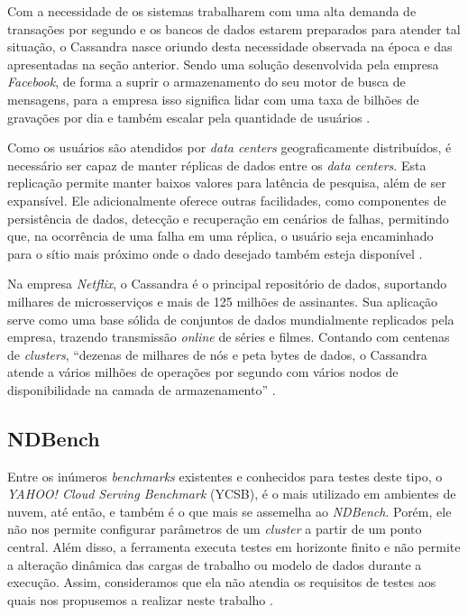 \documentclass[12pt,english,brazil]{article}
\begin{document}
Com a necessidade de os sistemas trabalharem com uma alta demanda de transações por segundo e os bancos de dados estarem preparados para atender tal situação, o Cassandra nasce oriundo desta necessidade observada na época e das apresentadas na seção anterior. Sendo uma solução desenvolvida pela empresa \textit{Facebook}, de forma a suprir o armazenamento do seu motor de busca de mensagens, para a empresa isso significa lidar com uma taxa de bilhões de gravações por dia e também escalar pela quantidade de usuários \cite{CASSANDRA}.

Como os usuários são atendidos por \textit{data centers} geograficamente distribuídos, é necessário ser capaz de manter réplicas de dados entre os \textit{data centers}. Esta replicação permite manter baixos valores para latência de pesquisa, além de ser expansível. Ele adicionalmente oferece outras facilidades, como componentes de persistência de dados, detecção e recuperação em cenários de falhas, permitindo que, na ocorrência de uma falha em uma réplica, o usuário seja encaminhado para o sítio mais próximo onde o dado desejado também esteja disponível \cite{overviewCassandra}.

Na empresa \textit{Netflix}, o Cassandra é o principal repositório de dados, suportando milhares de microsserviços e mais de 125 milhões de assinantes. Sua aplicação serve como uma base sólida de conjuntos de dados mundialmente replicados pela empresa, trazendo transmissão \textit{online} de séries e filmes. Contando com centenas de \textit{clusters}, ``dezenas de milhares de nós e peta bytes de dados, o Cassandra atende a vários milhões de operações por segundo com vários nodos de disponibilidade na camada de armazenamento'' \cite{NDBenchPAPER}.

\subsection{NDBench} \label{sec:NDBench}

Entre os inúmeros \textit{benchmarks} existentes e conhecidos para testes deste tipo, o \textit{YAHOO! Cloud Serving Benchmark} (YCSB), é o mais utilizado em ambientes de nuvem, até então, e também é o que mais se assemelha ao \textit{NDBench}. Porém, ele não nos permite configurar parâmetros de um \textit{cluster} a partir de um ponto central. Além disso, a ferramenta executa testes em horizonte finito e não permite a alteração dinâmica das cargas de trabalho ou modelo de dados durante a execução. Assim, consideramos que ela não atendia os requisitos de testes aos quais nos propusemos a realizar neste trabalho \cite{NDBenchPAPER}.
\end{document}
